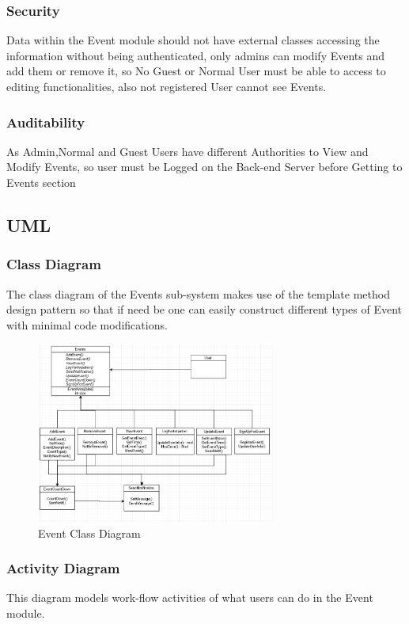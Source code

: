 \subsubsection{Security}
Data within the Event module should not have external classes accessing the information without being authenticated, only admins can modify Events and add them or remove it, so No Guest or Normal User must be able to access to editing functionalities, also not registered User cannot see Events.

\subsubsection{Auditability}
As Admin,Normal and Guest Users have different Authorities to View and Modify Events, so user must be Logged on the Back-end Server before Getting to Events section

\pagebreak
\subsection{UML}
\subsubsection{Class Diagram}
The class diagram of the Events sub-system makes use of the template method design pattern so that if need be one can easily construct different types of Event with minimal code modifications.

\begin{figure}[H]
	\centering
	\includegraphics[width=0.7\textwidth]{event/ClassDiagramTask2.PNG}
	\caption{Event Class Diagram}
\end{figure}



\pagebreak
\subsubsection{Activity Diagram}
This diagram models work-flow activities of what users can do in the Event module.

